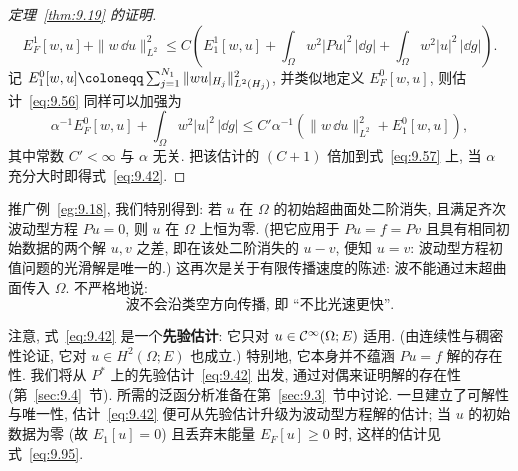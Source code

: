 \begin{proof}[定理~\ref{thm:9.19} 的证明]
\begin{equation}\label{eq:9.57}
    E_F^1[w, u] + \|w \, \dd u\|_{L^2}^2 \le C \left( E_1^1[w, u] + \int_{\Omega} w^2 |P u|^2 \, |\dd g| + \int_{\Omega} w^2 |u|^2 \, |\dd g| \right).
\end{equation}
记 $E_1^0[w, u] \defeq \sum_{j=1}^{N_1} \|w u|_{H_j}\|_{L^2(H_j)}^2$, 并类似地定义 $E_F^0[w, u]$, 则估计~\eqref{eq:9.56} 同样可以加强为
\begin{equation}\label{eq:9.58}
    \alpha^{-1} E_F^0[w, u] + \int_{\Omega} w^2 |u|^2 \, |\dd g| \le C' \alpha^{-1} \left( \|w \, \dd u\|_{L^2}^2 + E_1^0[w, u] \right),
\end{equation}
其中常数 $C' < \infty$ 与 $\alpha$ 无关. 把该估计的 $(C+1)$ 倍加到式~\eqref{eq:9.57} 上, 当 $\alpha$ 充分大时即得式~\eqref{eq:9.42}.
\end{proof}

推广例~\ref{eg:9.18}, 我们特别得到: 若 $u$ 在 $\Omega$ 的初始超曲面处二阶消失, 且满足齐次波动型方程 $P u = 0$, 则 $u$ 在 $\Omega$ 上恒为零. (把它应用于 $P u = f = P v$ 且具有相同初始数据的两个解 $u, v$ 之差, 即在该处二阶消失的 $u - v$, 便知 $u = v$: 波动型方程初值问题的光滑解是唯一的.) 这再次是关于有限传播速度的陈述: 波不能通过末超曲面传入 $\Omega$. 不严格地说:
\begin{equation}\label{eq:9.59}
    \text{波不会沿类空方向传播, 即 ``不比光速更快''.}
\end{equation}

注意, 式~\eqref{eq:9.42} 是一个\textbf{先验估计}: 它只对 $u \in \mathcal{C}^\infty(\Omega; E)$ 适用. (由连续性与稠密性论证, 它对 $u \in H^2(\Omega; E)$ 也成立.) 特别地, 它本身并不蕴涵 $P u = f$ 解的存在性. 我们将从 $P^*$ 上的先验估计~\eqref{eq:9.42} 出发, 通过对偶来证明解的存在性 (第~\ref{sec:9.4}~节). 所需的泛函分析准备在第~\ref{sec:9.3}~节中讨论. 一旦建立了可解性与唯一性, 估计~\eqref{eq:9.42} 便可从先验估计升级为波动型方程解的估计; 当 $u$ 的初始数据为零 (故 $E_1[u] = 0$) 且丢弃末能量 $E_F[u] \ge 0$ 时, 这样的估计见式~\eqref{eq:9.95}.

